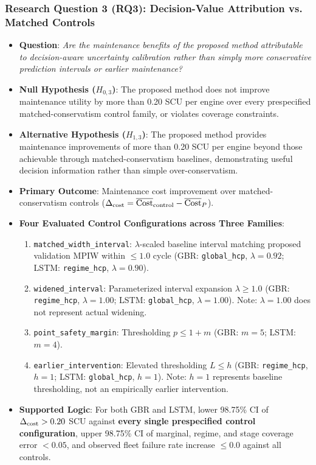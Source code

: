 \subsubsection*{Research Question 3 (RQ3): Decision-Value Attribution vs. Matched Controls}
\begin{itemize}
  \item \textbf{Question}: \textit{Are the maintenance benefits of the proposed method attributable to decision-aware uncertainty calibration rather than simply more conservative prediction intervals or earlier maintenance?}
  \item \textbf{Null Hypothesis ($H_{0,3}$)}: The proposed method does not improve maintenance utility by more than 0.20 SCU per engine over every prespecified matched-conservatism control family, or violates coverage constraints.
  \item \textbf{Alternative Hypothesis ($H_{1,3}$)}: The proposed method provides maintenance improvements of more than 0.20 SCU per engine beyond those achievable through matched-conservatism baselines, demonstrating useful decision information rather than simple over-conservatism.
  \item \textbf{Primary Outcome}: Maintenance cost improvement over matched-conservatism controls ($\Delta_{\text{cost}} = \overline{\text{Cost}}_{\text{control}} - \overline{\text{Cost}}_P$).
  \item \textbf{Four Evaluated Control Configurations across Three Families}:
    \begin{enumerate}
      \item \texttt{matched\_width\_interval}: $\lambda$-scaled baseline interval matching proposed validation MPIW within $\le 1.0$ cycle (GBR: \texttt{global\_hcp}, $\lambda=0.92$; LSTM: \texttt{regime\_hcp}, $\lambda=0.90$).
      \item \texttt{widened\_interval}: Parameterized interval expansion $\lambda \ge 1.0$ (GBR: \texttt{regime\_hcp}, $\lambda=1.00$; LSTM: \texttt{global\_hcp}, $\lambda=1.00$). Note: $\lambda=1.00$ does not represent actual widening.
      \item \texttt{point\_safety\_margin}: Thresholding $p \le 1 + m$ (GBR: $m=5$; LSTM: $m=4$).
      \item \texttt{earlier\_intervention}: Elevated thresholding $L \le h$ (GBR: \texttt{regime\_hcp}, $h=1$; LSTM: \texttt{global\_hcp}, $h=1$). Note: $h=1$ represents baseline thresholding, not an empirically earlier intervention.
    \end{enumerate}
  \item \textbf{Supported Logic}: For both GBR and LSTM, lower 98.75\% CI of $\Delta_{\text{cost}} > 0.20$ SCU against \textbf{every single prespecified control configuration}, upper 98.75\% CI of marginal, regime, and stage coverage error $< 0.05$, and observed fleet failure rate increase $\le 0.0$ against all controls.

\end{itemize}
